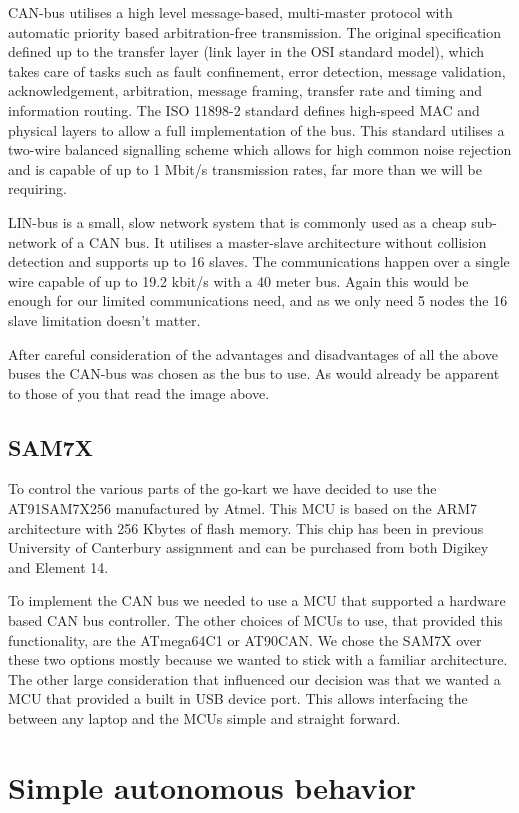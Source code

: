 CAN-bus utilises a high level message-based, multi-master protocol with
automatic priority based arbitration-free transmission.  The original
specification defined up to the transfer layer (link layer in the OSI standard
model), which takes care of tasks such as fault confinement, error detection,
message validation, acknowledgement, arbitration, message framing, transfer rate
and timing and information routing.  The ISO 11898-2 standard defines high-speed
MAC and physical layers to allow a full implementation of the bus.  This
standard utilises a two-wire balanced signalling scheme which allows for high
common noise rejection and is capable of up to 1 Mbit/s transmission rates, far
more than we will be requiring.

LIN-bus is a small, slow network system that is commonly used as a cheap
sub-network of a CAN bus.  It utilises a master-slave architecture without
collision detection and supports up to 16 slaves.  The communications happen
over a single wire capable of up to 19.2 kbit/s with a 40 meter bus.  Again this
would be enough for our limited communications need, and as we only need 5 nodes
the 16 slave limitation doesn't matter.

After careful consideration of the advantages and disadvantages of all the above
buses the CAN-bus was chosen as the bus to use.  As would already be apparent to
those of you that read the image above.

\subsection{SAM7X}
To control the various parts of the go-kart we have decided to use the
AT91SAM7X256\cite{SAM7Xdatasheet} manufactured by Atmel. This MCU is
based on the ARM7 architecture with 256 Kbytes of flash memory. This chip has
been in previous University of Canterbury assignment and can be purchased from
both Digikey and Element 14.

To implement the CAN bus we needed to use a MCU that supported a hardware based
CAN bus controller. The other choices of MCUs to use, that provided this
functionality, are the ATmega64C1 or AT90CAN. We chose the SAM7X over these two
options mostly because we wanted to stick with a familiar architecture. The
other large consideration that influenced our decision was that we wanted a MCU
that provided a built in USB device port. This allows interfacing the between
any laptop and the MCUs simple and straight forward.

\section{Simple autonomous behavior}

